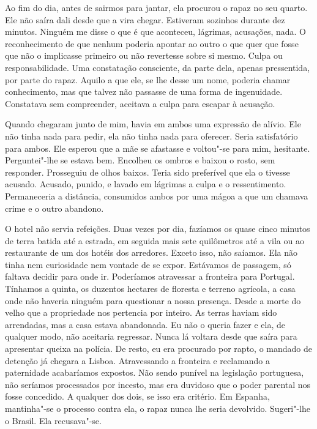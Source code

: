Ao fim do dia, antes de sairmos para jantar, ela procurou o rapaz no seu
quarto. Ele não saíra dali desde que a vira chegar. Estiveram sozinhos
durante dez minutos. Ninguém me disse o que é que aconteceu, lágrimas,
acusações, nada. O reconhecimento de que nenhum poderia apontar ao outro
o que quer que fosse que não o implicasse primeiro ou não revertesse
sobre si mesmo. Culpa ou responsabilidade. Uma constatação consciente,
da parte dela, apenas pressentida, por parte do rapaz. Aquilo a que ele,
se lhe desse um nome, poderia chamar conhecimento, mas que talvez não
passasse de uma forma de ingenuidade. Constatava sem compreender,
aceitava a culpa para escapar à acusação.

Quando chegaram junto de mim, havia em ambos uma expressão de alívio.
Ele não tinha nada para pedir, ela não tinha nada para oferecer. Seria
satisfatório para ambos. Ele esperou que a mãe se afastasse e voltou"-se
para mim, hesitante. Perguntei"-lhe se estava bem. Encolheu os ombros e
baixou o rosto, sem responder. Prosseguiu de olhos baixos. Teria sido
preferível que ela o tivesse acusado. Acusado, punido, e lavado em
lágrimas a culpa e o ressentimento. Permaneceria a distância, consumidos
ambos por uma mágoa a que um chamava crime e o outro abandono.

O hotel não servia refeições. Duas vezes por dia, fazíamos os quase
cinco minutos de terra batida até a estrada, em seguida mais sete
quilômetros até a vila ou ao restaurante de um dos hotéis dos arredores.
Exceto isso, não saíamos. Ela não tinha nem curiosidade nem vontade de
se expor. Estávamos de passagem, só faltava decidir para onde ir.
Poderíamos atravessar a fronteira para Portugal. Tínhamos a quinta, os
duzentos hectares de floresta e terreno agrícola, a casa onde não
haveria ninguém para questionar a nossa presença. Desde a morte do velho
que a propriedade nos pertencia por inteiro. As terras haviam sido
arrendadas, mas a casa estava abandonada. Eu não o queria fazer e ela,
de qualquer modo, não aceitaria regressar. Nunca lá voltara desde que
saíra para apresentar queixa na polícia. De resto, eu era procurado por
rapto, o mandado de detenção já chegara a Lisboa. Atravessando a
fronteira e reclamando a paternidade acabaríamos expostos. Não sendo
punível na legislação portuguesa, não seríamos processados por incesto,
mas era duvidoso que o poder parental nos fosse concedido. A qualquer
dos dois, se isso era critério. Em Espanha, mantinha"-se o processo
contra ela, o rapaz nunca lhe seria devolvido. Sugeri"-lhe o Brasil. Ela
recusava"-se.

